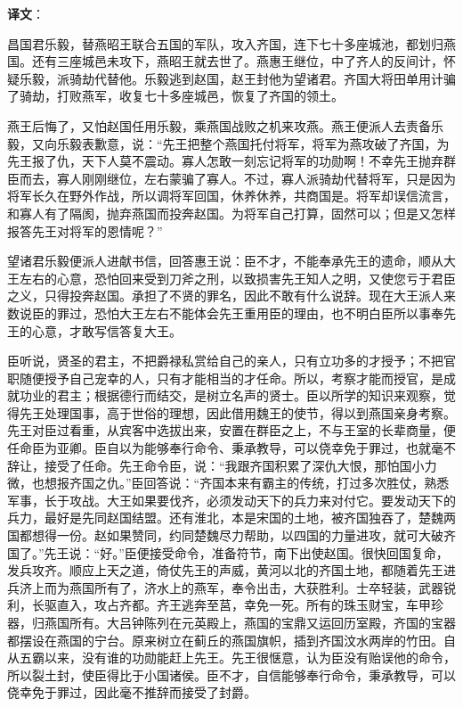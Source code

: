 \documentclass[12pt,UTF-8,openany,a4]{ctexbook}
\begin{document}
\newpage

\begin{Large}
   \noindent \textbf{译文}：
\end{Large}

\vspace{1em}

\begin{large}\yiwen
    
    昌国君乐毅，替燕昭王联合五国的军队，攻入齐国，连下七十多座城池，都划归燕国。还有三座城邑未攻下，燕昭王就去世了。燕惠王继位，中了齐人的反间计，怀疑乐毅，派骑劫代替他。乐毅逃到赵国，赵王封他为望诸君。齐国大将田单用计骗了骑劫，打败燕军，收复七十多座城邑，恢复了齐国的领土。
    
    燕王后悔了，又怕赵国任用乐毅，乘燕国战败之机来攻燕。燕王便派人去责备乐毅，又向乐毅表歉意，说：“先王把整个燕国托付将军，将军为燕攻破了齐国，为先王报了仇，天下人莫不震动。寡人怎敢一刻忘记将军的功勋啊！不幸先王抛弃群臣而去，寡人刚刚继位，左右蒙骗了寡人。不过，寡人派骑劫代替将军，只是因为将军长久在野外作战，所以调将军回国，休养休养，共商国是。将军却误信流言，和寡人有了隔阂，抛弃燕国而投奔赵国。为将军自己打算，固然可以；但是又怎样报答先王对将军的恩情呢？”
    
    望诸君乐毅便派人进献书信，回答惠王说：臣不才，不能奉承先王的遗命，顺从大王左右的心意，恐怕回来受到刀斧之刑，以致损害先王知人之明，又使您亏于君臣之义，只得投奔赵国。承担了不贤的罪名，因此不敢有什么说辞。现在大王派人来数说臣的罪过，恐怕大王左右不能体会先王重用臣的理由，也不明白臣所以事奉先王的心意，才敢写信答复大王。
    
    臣听说，贤圣的君主，不把爵禄私赏给自己的亲人，只有立功多的才授予；不把官职随便授予自己宠幸的人，只有才能相当的才任命。所以，考察才能而授官，是成就功业的君主；根据德行而结交，是树立名声的贤士。臣以所学的知识来观察，觉得先王处理国事，高于世俗的理想，因此借用魏王的使节，得以到燕国亲身考察。先王对臣过看重，从宾客中选拔出来，安置在群臣之上，不与王室的长辈商量，便任命臣为亚卿。臣自以为能够奉行命令、秉承教导，可以侥幸免于罪过，也就毫不辞让，接受了任命。先王命令臣，说：“我跟齐国积累了深仇大恨，那怕国小力微，也想报齐国之仇。”臣回答说：“齐国本来有霸主的传统，打过多次胜仗，熟悉军事，长于攻战。大王如果要伐齐，必须发动天下的兵力来对付它。要发动天下的兵力，最好是先同赵国结盟。还有淮北，本是宋国的土地，被齐国独吞了，楚魏两国都想得一份。赵如果赞同，约同楚魏尽力帮助，以四国的力量进攻，就可大破齐国了。”先王说：“好。”臣便接受命令，准备符节，南下出使赵国。很快回国复命，发兵攻齐。顺应上天之道，倚仗先王的声威，黄河以北的齐国土地，都随着先王进兵济上而为燕国所有了，济水上的燕军，奉令出击，大获胜利。士卒轻装，武器锐利，长驱直入，攻占齐都。齐王逃奔至莒，幸免一死。所有的珠玉财宝，车甲珍器，归燕国所有。大吕钟陈列在元英殿上，燕国的宝鼎又运回历室殿，齐国的宝器都摆设在燕国的宁台。原来树立在蓟丘的燕国旗帜，插到齐国汶水两岸的竹田。自从五霸以来，没有谁的功勋能赶上先王。先王很惬意，认为臣没有贻误他的命令，所以裂土封，使臣得比于小国诸侯。臣不才，自信能够奉行命令，秉承教导，可以侥幸免于罪过，因此毫不推辞而接受了封爵。
    

\end{large}
\end{document}
